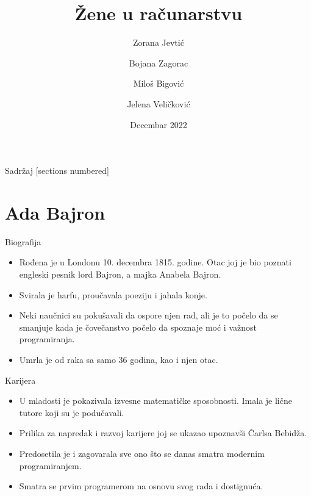 \documentclass[aspectratio=169]{beamer}
\title{Žene u računarstvu}
\author{ Zorana Jevtić \and Bojana Zagorac\\  \and Miloš Bigović  \and Jelena Veličković\\}
\date{Decembar 2022}
\begin{document}
\titleframe  %


\begin{frame}{Sadržaj}
  [sections numbered]
  \tableofcontents[hideallsubsections]
\end{frame}

\section{Ada Bajron}

\begin{frame}{Biografija}
\begin{itemize}
        \item<1-> Rođena je u Londonu 10. decembra 1815. godine. Otac joj je bio poznati engleski pesnik lord Bajron, a majka Anabela Bajron.

        \item<2-> Svirala je harfu, proučavala poeziju i jahala konje.
        
        \item<3-> Neki naučnici su pokušavali da ospore njen rad, ali je to počelo da se smanjuje kada je čovečanstvo počelo da spoznaje moć i važnost programiranja.

        \item<4-> Umrla je od raka sa samo 36 godina, kao i njen otac.

    \end{itemize}
\end{frame}

\begin{frame}{Karijera}
    \begin{itemize}
        \item<1-> U mladosti je pokazivala izvesne matematičke sposobnosti. Imala je lične tutore koji su je podučavali. 
        
        \item<2-> Prilika za napredak i razvoj karijere joj se ukazao upoznavši Čarlsa Bebidža. 
        
        \item<3-> Predosetila je i zagovarala sve ono što se danas smatra modernim programiranjem.
        
        \item<4-> Smatra se prvim programerom na osnovu svog rada i dostignuća.
        
    \end{itemize}
\end{frame}
\end{document}
